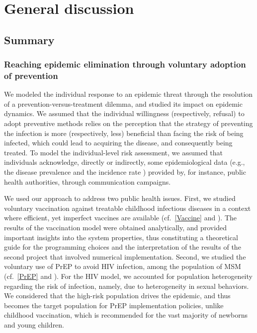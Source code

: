 %
\chapter{General discussion}
\label{Discussion}

\section{Summary}

\subsection{Reaching epidemic elimination through voluntary adoption of prevention}

We modeled the individual response to an epidemic threat through the resolution of a prevention-versus-treatment dilemma, and studied its impact on epidemic dynamics. We assumed that the individual willingness (respectively, refusal) to adopt preventive methods relies on the perception that the strategy of preventing the infection is more (respectively, less) beneficial than facing the risk of being infected, which could lead to acquiring the disease, and consequently being treated. To model the individual-level risk assessment, we assumed that individuals acknowledge, directly or indirectly, some epidemiological data (e.g., the disease prevalence \cite[]{Jijon2017} and the incidence rate \cite[]{Jijon2021}) provided by, for instance, public health authorities, through communication campaigns. 

We used our approach to address two public health issues. First, we studied voluntary vaccination against treatable childhood infectious diseases in a context where efficient, yet imperfect vaccines are available (cf.~\autoref{Vaccine} and \cite{Jijon2017}). The results of the vaccination model were obtained analytically, and provided important insights into the system properties, thus constituting a theoretical guide for the programming choices and the interpretation of the results of the second project that involved numerical implementation. Second, we studied the voluntary use of PrEP to avoid HIV infection, among the population of MSM (cf.~\autoref{PrEP} and \cite{Jijon2021}). For the HIV model, we accounted for population heterogeneity regarding the risk of infection, namely, due to heterogeneity in sexual behaviors. We considered that the high-risk population drives the epidemic, and thus becomes the target population for PrEP implementation policies, unlike childhood vaccination, which is recommended for the vast majority of newborns and young children. 

